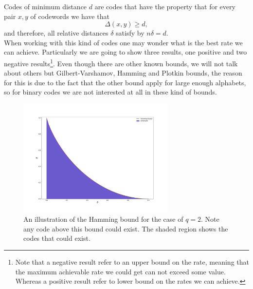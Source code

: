 \indent Codes of minimum distance $d$ are codes that have the property that for every pair $x,y$ of codewords we have that
\begin{equation}
\Delta(x,y) \geq d,
\end{equation}
and therefore, all relative distances $\delta$ satisfy by $n\delta=d$.\\

\indent When working with this kind of codes one may wonder what is the best rate we can achieve. Particularly we are going to show three results, one positive and two negative results\footnote{Note that a negative result refer to an upper bound on the rate, meaning that the maximum achievable rate we could get can not exceed some value. Whereas a positive result refer to  lower bound on the rates we can achieve.}. Even though there are other known bounds, we will not talk about others but Gilbert-Varshamov, Hamming and Plotkin bounds, the reason for this is due to the fact that the other bound apply for large enough alphabets, so for binary codes we are not interested at all in these kind of bounds\cite{mackay_information_2003}.
\begin{figure}
\centering
\includegraphics[width=0.7\textwidth]{Figures/Hamming_bound.png}
\caption{An illustration of the Hamming bound for the case of $q=2$. Note any code above this bound could exist. The shaded region shows the codes that could exist.  }
\end{figure}
